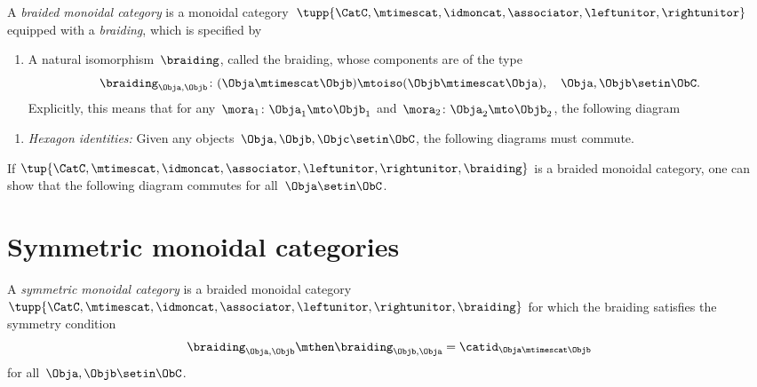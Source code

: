 

\begin{ctdefinition}
    \label{def:braided_moncat}
    A \emph{braided monoidal category} is a monoidal category~$\tupp{\CatC,\mtimescat, \idmoncat, \associator, \leftunitor, \rightunitor}$ equipped with a \emph{braiding}, which is specified by

    \constit
    \begin{enumerate}
        \item A natural isomorphism~$\braiding$, called the braiding, whose components are of the type
              \begin{equation}
                  \label{eq:braiding_symmetry}
                  \braiding_{\Obja,\Objb}\colon (\Obja\mtimescat \Objb)\mtoiso (\Objb\mtimescat \Obja), \quad \Obja,\Objb \setin \ObC.
              \end{equation}
              Explicitly, this means that for any~$\mora_1\colon \Obja_1\mto \Objb_1$ and~$\mora_2\colon \Obja_2\mto \Objb_2$, the following diagram
    \end{enumerate}

    \condit
    \begin{enumerate}
        \item \emph{Hexagon identities:} Given any objects~$\Obja,\Objb,\Objc\setin \ObC$, the following diagrams must commute.
    \end{enumerate}
\end{ctdefinition}

\begin{remark}
    If $\tup{\CatC,\mtimescat, \idmoncat, \associator, \leftunitor, \rightunitor, \braiding}$ is a braided monoidal category, one can show that the following diagram commutes for all~$\Obja \setin \ObC$.
\end{remark}

\section{Symmetric monoidal categories}

\begin{ctdefinition}
    \label{def:sym-mon-cat}
    A \emph{symmetric monoidal category} is a braided monoidal category~$\tupp{\CatC,\mtimescat, \idmoncat, \associator, \leftunitor, \rightunitor, \braiding}$ for which the braiding satisfies the symmetry condition
    \begin{equation}
        \label{eq:braiding-symmetry}
        \braiding_{\Obja,\Objb} \mthen \braiding_{\Objb,\Obja} = \catid_{\Obja \mtimescat \Objb}
    \end{equation}
    for all~$\Obja, \Objb \setin \ObC$.
\end{ctdefinition}

